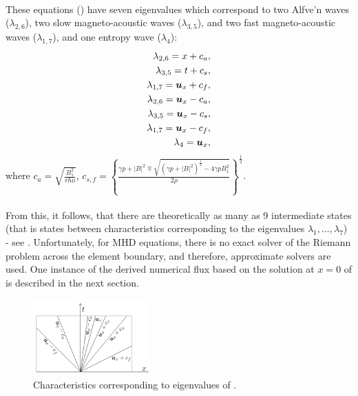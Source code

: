 \paragraph{}
These equations () have seven eigenvalues which correspond to two Alfve'n waves ($\lambda_{2, 6}$), two slow magneto-acoustic waves ($\lambda_{3, 5}$), and two fast magneto-acoustic waves ($\lambda_{1, 7}$), and one entropy wave ($\lambda_{4}$):
\begin{align}
\lambda_{2, 6} = x + c_a,\\
\lambda_{3, 5} = t + c_s,\\
\lambda_{1, 7} = \mbox{\boldmath $u$}_x + c_f,\\
\lambda_{2, 6} = \mbox{\boldmath $u$}_x - c_a,\\
\lambda_{3, 5} = \mbox{\boldmath $u$}_x - c_s,\\
\lambda_{1, 7} = \mbox{\boldmath $u$}_x - c_f,\\
\lambda_{4} = \mbox{\boldmath $u$}_x,
\end{align}
where $c_a = \sqrt{\frac{B_1^2}{rho}}$, $c_{s, f} = \left\{\frac{\gamma p + |B|^2 \mp \sqrt{\left(\gamma p + |B|^2\right)^{\frac12} - 4\gamma p B_1^2}}{2\rho}\right\}^{\frac12}$.
\paragraph{}
From this, it follows, that there are theoretically as many as 9 intermediate states (that is states between characteristics corresponding to the eigenvalues $\lambda_1, ..., \lambda_7$) - see . Unfortunately, for MHD equations, there is no exact solver of the Riemann problem across the element boundary, and therefore, approximate solvers are used. One instance of the derived numerical flux based on the solution at $x = 0$ of  is described in the next section.
	
\begin{figure}[H]
	\centering
		\includegraphics[width=0.4\textwidth]{img/riemann/allStates.jpg}
		\vspace{-3mm}
	\caption{Characteristics corresponding to eigenvalues of .}
	\label{figure:allRiemannStates}
\end{figure}

